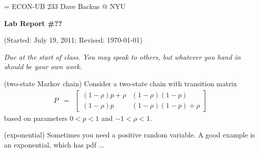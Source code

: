 \documentclass[11pt]{exam}
\begin{document}
\parskip=\bigskipamount
\parindent=0.0in
\thispagestyle{empty}
{\large ECON-UB 233 \hfill Dave Backus @ NYU}

\bigskip\bigskip
\centerline{\Large \bf Lab Report \#??}
\centerline{(Started: July 19, 2011; Revised: \today)}

\bigskip
{\it Due at the start of class.
You may speak to others, but whatever you hand in should be your own work.}

\begin{questions}
\question (two-state Markov chain)
Consider a two-state chain with transition matrix
\begin{eqnarray*}
    P &=& \left[
            \begin{array}{cc}
            (1-\rho) p + \rho & (1-\rho)(1-p) \\
            (1-\rho) p & (1-\rho)(1-p) + \rho
            \end{array}
          \right]
\end{eqnarray*}
based on parameters $ 0 < p < 1$ and $-1 < \rho < 1$.

\question (exponential)
Sometimes you need a positive random variable.  
A good example is an exponential, which has pdf ...
\end{questions}
\end{document}
